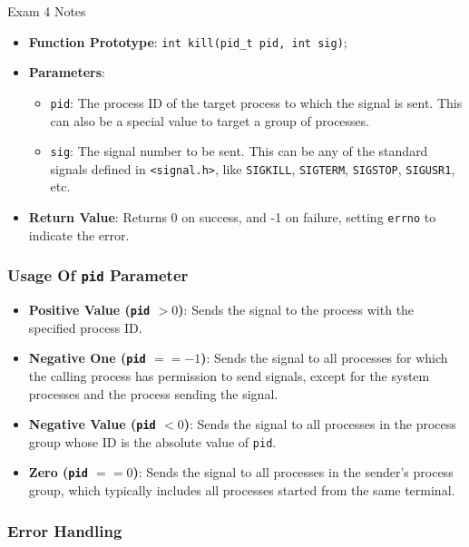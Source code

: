 \begin{examnotes}{Exam 4 Notes}
\begin{highlight}
        \begin{itemize}
            \item \textbf{Function Prototype}: \texttt{int kill(pid\_t pid, int sig)};
            \item \textbf{Parameters}:
            \begin{itemize}
                \item \texttt{pid}: The process ID of the target process to which the signal is sent. This can also be a special value to target a group of processes.
                \item \texttt{sig}: The signal number to be sent. This can be any of the standard signals defined in \texttt{<signal.h>}, like \texttt{SIGKILL}, \texttt{SIGTERM}, \texttt{SIGSTOP}, \texttt{SIGUSR1}, etc.
            \end{itemize}
            \item \textbf{Return Value}: Returns 0 on success, and -1 on failure, setting \texttt{errno} to indicate the error.
        \end{itemize}

        \subsubsection*{Usage Of \texttt{pid} Parameter}

        \begin{itemize}
            \item \textbf{Positive Value (\texttt{pid} $> 0$)}: Sends the signal to the process with the specified process ID.
            \item \textbf{Negative One (\texttt{pid} $== -1$)}: Sends the signal to all processes for which the calling process has permission to send signals, except for the system processes and the 
            process sending the signal.
            \item \textbf{Negative Value (\texttt{pid} $< 0$)}: Sends the signal to all processes in the process group whose ID is the absolute value of \texttt{pid}.
            \item \textbf{Zero (\texttt{pid} $== 0$)}: Sends the signal to all processes in the sender's process group, which typically includes all processes started from the same terminal.
        \end{itemize}

        \subsubsection*{Error Handling}


\end{highlight}
\end{examnotes}
